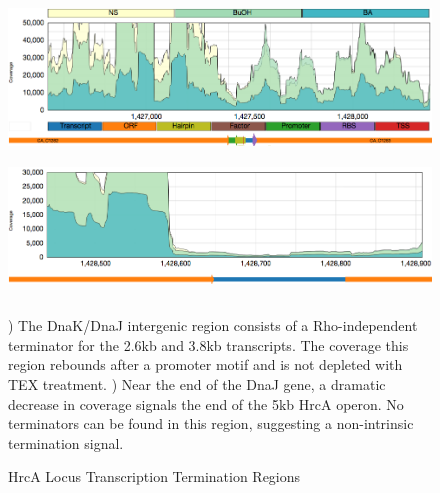 \begin{figure}
\small
{\includegraphics[width=\textwidth,height=1.5in]{images/Assembly/Examples/HrcA/DnaKJ-IGR.png}
\label{fig:9a}}
{\includegraphics[width=\textwidth,height=1.5in]{images/Assembly/Examples/HrcA/HrcA-termination.png}
\label{fig:9b}}
\caption{HrcA Locus Transcription Termination Regions}
) The DnaK/DnaJ intergenic region consists of a Rho-independent terminator for the 2.6kb and 3.8kb transcripts. The coverage this region rebounds after a promoter motif and is not depleted with TEX treatment. ) Near the end of the DnaJ gene, a dramatic decrease in coverage signals the end of the 5kb HrcA operon. No terminators can be found in this region, suggesting a non-intrinsic termination signal.
\end{figure}


